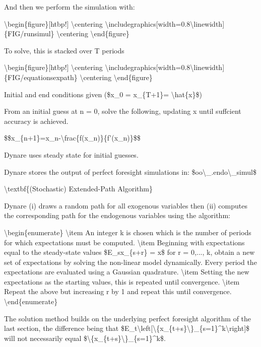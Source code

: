 \documentclass[10pt,math=newtx,citestyle=gb7714-2015,bibstyle=gb7714-2015]{elegantbook}
\begin{document}
	And then we perform the simulation with:
	
	\textbackslash{}begin\{figure\}[htbp!]
	\textbackslash{}centering
	\textbackslash{}includegraphics[width=0.8\textbackslash{}linewidth]\{FIG/runsimul\}
	\textbackslash{}centering
	\textbackslash{}end\{figure\}
	
	To solve, this is stacked over T periods
	
	\textbackslash{}begin\{figure\}[htbp!]
	\textbackslash{}centering
	\textbackslash{}includegraphics[width=0.8\textbackslash{}linewidth]\{FIG/equationsexpath\}
	\textbackslash{}centering
	\textbackslash{}end\{figure\}
	
	Initial and end conditions given (\$x\_0 = x\_\{T+1\}= \textbackslash{}hat\{x\}\$)
	
	From an initial guess at n = 0, solve the following, updating x until suffcient accuracy is achieved.
	
	\$\$x\_\{n+1\}=x\_n-\textbackslash{}frac\{f(x\_n)\}\{f'(x\_n)\}\$\$
	
	Dynare uses steady state for initial guesses.
	
	Dynare stores the output of perfect foresight simulations in: \$oo\textbackslash{}\_.endo\textbackslash{}\_simul\$
	
	\textbackslash{}textbf\{(Stochastic) Extended-Path Algorithm\}
	
	Dynare (i) draws a random path for all exogenous variables then (ii) computes the corresponding path for the endogenous variables using the algorithm:
	
	\textbackslash{}begin\{enumerate\}
	\textbackslash{}item An integer k is chosen which is the number of periods for which expectations must be computed.
	\textbackslash{}item Beginning with expectations equal to the steady-state values \$E\_sx\_\{s+r\} = x\$ for r = 0,..., k, obtain a new set of expectations by solving the non-linear model dynamically. Every period the expectations are evaluated using a Gaussian quadrature.
	\textbackslash{}item Setting the new expectations as the starting values, this is repeated until convergence.
	\textbackslash{}item Repeat the above but increasing r by 1 and repeat this until convergence.
	\textbackslash{}end\{enumerate\}
	
	The solution method builds on the underlying perfect foresight algorithm of the last section, the difference being that \$E\_t\textbackslash{}left[\textbackslash{}\{x\_\{t+s\}\textbackslash{}\}\_\{s=1\}\^{}k\textbackslash{}right]\$ will not necessarily equal \$\textbackslash{}\{x\_\{t+s\}\textbackslash{}\}\_\{s=1\}\^{}k\$.
	
\end{document}
